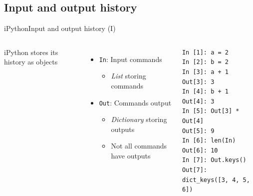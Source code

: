 \documentclass[10pt,compress]{beamer} %
\begin{document}
\subsection{Input and output history}
\begin{frame}[fragile]{iPython}{Input and output history (I)}
	\begin{columns}
	iPython stores its history as objects
	\begin{itemize}
		\item \texttt{In}: Input commands
			\begin{itemize}
			\item \textit{List} storing commands
			\end{itemize}
		\item \texttt{Out}: Commands output
			\begin{itemize}
			\item \textit{Dictionary} storing outputs
			\item Not all commands have outputs
			\end{itemize}
	\end{itemize}

	\vspace{-0.2cm}

		\footnotesize{
	\begin{exampleblock}{}
	   \vspace{-0.2cm}
		\begin{verbatim}
In [1]: a = 2
In [2]: b = 2
In [3]: a + 1
Out[3]: 3
In [4]: b + 1
Out[4]: 3
In [5]: Out[3] * Out[4]
Out[5]: 9
In [6]: len(In)
Out[6]: 10
In [7]: Out.keys()
Out[7]: dict_keys([3, 4, 5, 6])
\end{verbatim}
	   \vspace{-0.2cm}
	\end{exampleblock}
}
	\end{columns}
\end{frame}
\end{document}
